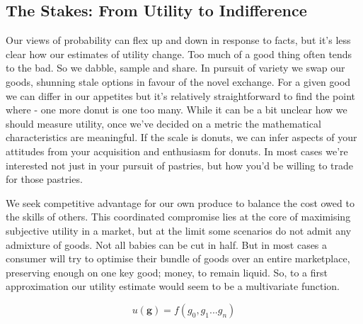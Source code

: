 \documentclass[
]{book}
\theoremstyle{definition}
\theoremstyle{definition}
\theoremstyle{definition}
\theoremstyle{remark}
\begin{document}
\hypertarget{the-stakes-from-utility-to-indifference}{%
\subsection{The Stakes: From Utility to Indifference}\label{the-stakes-from-utility-to-indifference}}

Our views of probability can flex up and down in response to facts, but it's less clear how our estimates of utility change. Too much of a good thing often tends to the bad. So we dabble, sample and share. In pursuit of variety we swap our goods, shunning stale options in favour of the novel exchange. For a given good we can differ in our appetites but it's relatively straightforward to find the point where - one more donut is one too many. While it can be a bit unclear how we should measure utility, once we've decided on a metric the mathematical characteristics are meaningful. If the scale is donuts, we can infer aspects of your attitudes from your acquisition and enthusiasm for donuts. In most cases we're interested not just in your pursuit of pastries, but how you'd be willing to trade for those pastries.

We seek competitive advantage for our own produce to balance the cost owed to the skills of others. This coordinated compromise lies at the core of maximising subjective utility in a market, but at the limit some scenarios do not admit any admixture of goods. Not all babies can be cut in half. But in most cases a consumer will try to optimise their bundle of goods over an entire marketplace, preserving enough on one key good; money, to remain liquid. So, to a first approximation our utility estimate would seem to be a multivariate function.

\[ u(\mathbf{g}) = f(g_{0}, g_{1} ... g_{n}) \]
\end{document}
